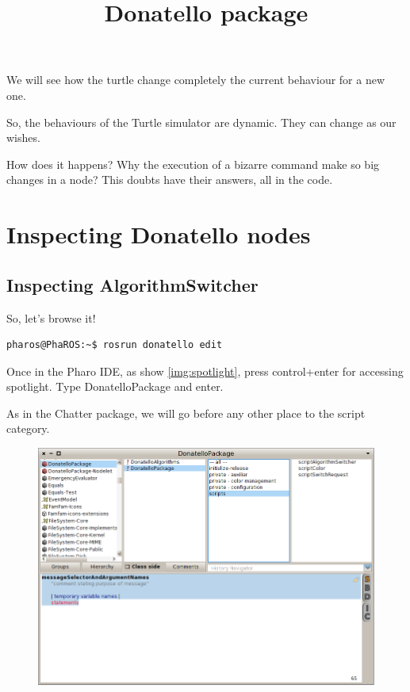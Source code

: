 \documentclass[a4paper,10pt,twoside]{book}
\begin{document}
			We will see how the turtle change completely the current behaviour for a new one. 
			
			
			So, the behaviours of the Turtle simulator are dynamic. They can change as our wishes.
			
			
			
			How does it happens? Why the execution of a bizarre command make so big changes in a node? This doubts have their answers, all in the code.
			
			\section{Inspecting Donatello nodes}
			
			\subsection{Inspecting AlgorithmSwitcher }
			
			 So, let's browse it! 
			
			\begin{lstlisting}[language=bash,title={ Editing }]
				pharos@PhaROS:~$ rosrun donatello edit
			\end{lstlisting}
			
			Once in the Pharo IDE, as show \autoref{img:spotlight}, press control+enter for accessing spotlight. Type DonatelloPackage and enter. 
			
			As in the Chatter package, we will go before any other place to the script category. 
			
			\begin{figure}[!htbp]
  				\centering
    				\includegraphics[width=1\textwidth]{DonatelloPackage.png}
				\centering
				
				\title{ Donatello package }
			\end{figure}
\end{document}

